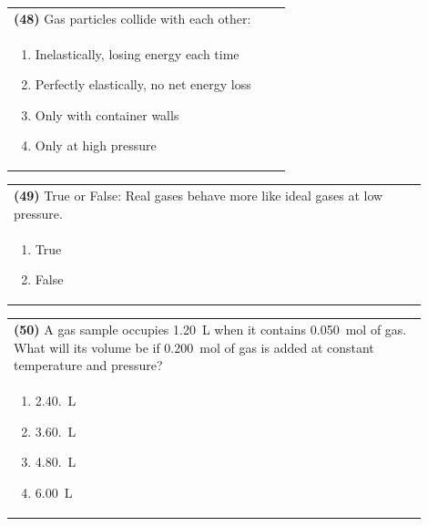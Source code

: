 \documentclass{article}
\begin{document}
\vspace{0.2cm}
\noindent\begin{tabular}{|p{0.9\linewidth}|}
\hline
\textbf{(48)} Gas particles collide with each other:\\[0.2cm]

\begin{minipage}[t]{0.85\linewidth}
\begin{enumerate}[label=\alph*.]
\item Inelastically, losing energy each time
\item Perfectly elastically, no net energy loss
\item Only with container walls
\item Only at high pressure
\end{enumerate}
\end{minipage}\\[0.2cm]
\hline
\end{tabular}

\newpage

\noindent\begin{tabular}{|p{0.9\linewidth}|}
\hline
\textbf{(49)} True or False: Real gases behave more like ideal gases at low pressure.\\[0.2cm]

\begin{minipage}[t]{0.85\linewidth}
\begin{enumerate}[label=\alph*.]
\item True
\item False
\end{enumerate}
\end{minipage}\\[0.2cm]
\hline
\end{tabular}

\vspace{0.2cm}
\noindent\begin{tabular}{|p{0.9\linewidth}|}
\hline
\textbf{(50)} A gas sample occupies 1.20~L when it contains 0.050~mol of gas. What will its volume be if 0.200~mol of gas is added at constant temperature and pressure? \\[0.2cm]

\begin{minipage}[t]{0.85\linewidth}
\begin{enumerate}[label=\alph*.]
\item 2.40.~L
\item 3.60.~L
\item 4.80.~L
\item 6.00~L
\end{enumerate}
\end{minipage}\\[0.2cm]
\hline
\end{tabular}
\end{document}
